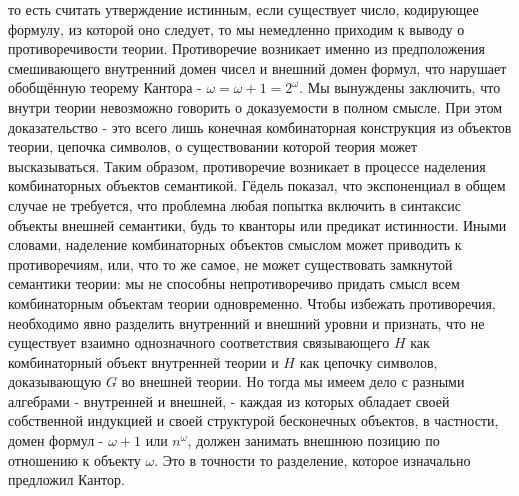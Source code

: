 \documentclass[12pt]{article}
\begin{document}
то есть считать утверждение истинным, если существует число, кодирующее формулу, из которой оно следует, то мы немедленно приходим к выводу о противоречивости теории. Противоречие возникает именно из предположения смешивающего внутренний домен чисел и внешний домен формул, что нарушает обобщённую теорему Кантора - $\omega = \omega + 1 = 2^\omega$. Мы вынуждены заключить, что внутри теории невозможно говорить о доказуемости в полном смысле. При этом доказательство - это всего лишь конечная комбинаторная конструкция из объектов теории, цепочка символов, о существовании которой теория может высказываться. Таким образом, противоречие возникает в процессе наделения комбинаторных объектов семантикой. Гёдель показал, что экспоненциал в общем случае не требуется, что проблемна любая попытка включить в синтаксис объекты внешней семантики, будь то кванторы или предикат истинности. Иными словами, наделение комбинаторных объектов смыслом может приводить к противоречиям, или, что то же самое, не может существовать замкнутой семантики теории: мы не способны непротиворечиво придать смысл всем комбинаторным объектам теории одновременно. Чтобы избежать противоречия, необходимо явно разделить внутренний и внешний уровни и признать, что не существует взаимно однозначного соответствия связывающего $H$ как комбинаторный объект внутренней теории и $H$ как цепочку символов, доказывающую $G$ во внешней теории. Но тогда мы имеем дело с разными алгебрами - внутренней и внешней, - каждая из которых обладает своей собственной индукцией и своей структурой бесконечных объектов, в частности, домен формул - $\omega + 1$ или $n^{\omega}$, должен занимать внешнюю позицию по отношению к объекту $\omega$. Это в точности то разделение, которое изначально предложил Кантор.
\end{document}
